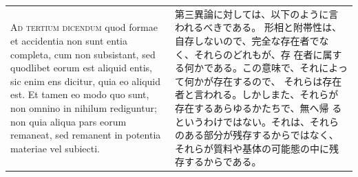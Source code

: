 \documentclass[paper=a4paper,fontsize=10pt,jafontsize=9pt,titlepage]{jlreq}
\begin{document}
\begin{longtable}{p{21em}p{21em}}
\\


{\scshape Ad tertium dicendum} quod formae et
accidentia non sunt entia completa, cum non subsistant, sed quodlibet
eorum est aliquid entis, sic enim ens dicitur, quia eo aliquid est. Et
tamen eo modo quo sunt, non omnino in nihilum rediguntur; non quia
aliqua pars eorum remaneat, sed remanent in potentia materiae vel
subiecti.

&

第三異論に対しては、以下のように言われるべきである。
形相と附帯性は、自存しないので、完全な存在者でなく、それらのどれもが、存
 在者に属する何かである。この意味で、それによって何かが存在するので、
 それらは存在者と言われる。しかしまた、それらが存在するあらゆるかたちで、無へ帰
 るというわけではない。それは、それらのある部分が残存するからではなく、
 それらが質料や基体の可能態の中に残存するからである。


\end{longtable}
\newpage
\end{document}
